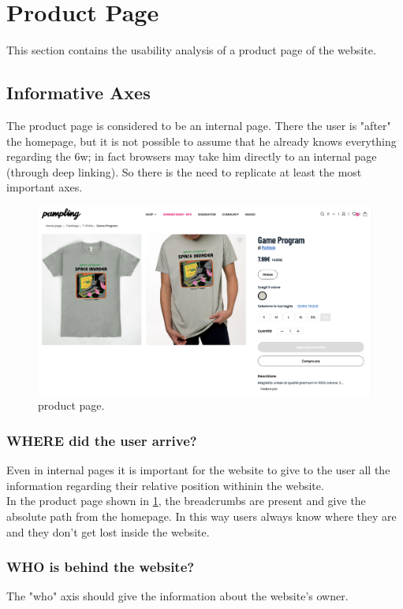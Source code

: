 \section{Product Page}
This section contains the usability analysis of a product page of the website.

\subsection{Informative Axes}
The product page is considered to be an internal page. There the user is "after" the homepage,
but it is not possible to assume that he already knows everything regarding the 6w; 
in fact browsers may take him directly to an internal page (through deep linking). 
So there is the need to replicate at least the most important axes.

\begin{figure}[H]
	\centering
	\includegraphics[scale=0.225]{images/product-page.png}
	\caption{product page.}
	\label{fig:product-page}
\end{figure}

\subsubsection{WHERE did the user arrive?}
Even in internal pages it is important for the website to give to the user all the information regarding their relative position withinin the website. \\

In the product page shown in \cref{fig:product-page}, the breadcrumbs are present and give the absolute path 
from the homepage. In this way users always know where they are and they don't get lost inside the website. 

\subsubsection{WHO is behind the website?} 
The "who" axis should give the information about the website's owner.\\


